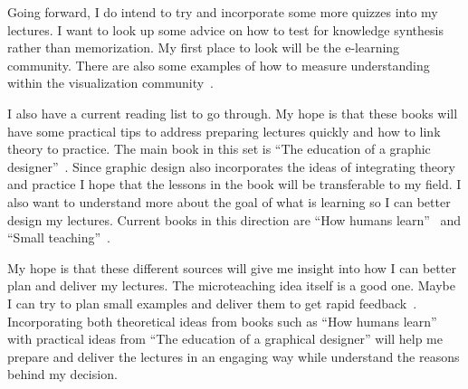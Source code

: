 \documentclass[
]{article}
\begin{document}
Going forward, I do intend to try and incorporate some more quizzes into my
lectures. I want to look up some advice on how to test for knowledge synthesis
rather than memorization. My first place to look will be the e-learning
community. There are also some examples of how to measure understanding within
the visualization community~\cite{Sedig:2003,Sajaniemi:2004}.

I also have a current reading list to go through. My hope is that these
books will have some practical tips to address preparing lectures
quickly and how to link theory to practice. The main book in this set is
``The education of a graphic designer''~\cite{Heller:2005}.
Since graphic
design also incorporates the ideas of integrating theory and practice I
hope that the lessons in the book will be transferable to my field. I
also want to understand more about the goal of what is learning so I can
better design my lectures. Current books in this direction are ``How
humans learn''~\cite{Tyler:2018} and ``Small teaching''~\cite{Lang:2016}.

My hope is that these different sources will give me insight into how I can
better plan and deliver my lectures. The microteaching idea itself is a good
one. Maybe I can try to plan small examples and deliver them to get rapid
feedback~\cite{McNall:2004}. Incorporating both theoretical ideas from books
such as ``How humans learn'' with practical ideas from ``The education of a
graphical designer'' will help me prepare and deliver the lectures in an
engaging way while understand the reasons behind my decision.



\end{document}

